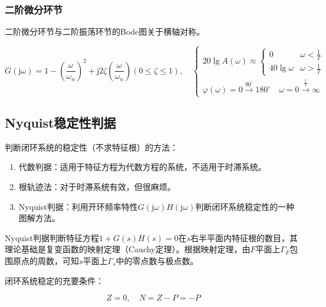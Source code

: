 \documentclass[cn, blue, normal, 12pt]{elegantnote}
\begin{document}
\subsubsection{二阶微分环节}

二阶微分环节与二阶振荡环节的Bode图关于横轴对称。

\begin{equation}
    G(\mathrm{j}\omega)=1-\left(\dfrac{\omega}{\omega_n}\right)^2+\mathrm{j}2\zeta\left(\dfrac{\omega}{\omega_n}\right) (0\leq \zeta\leq 1), \quad 
    \left\{
        \begin{array}{l}
            20\lg{A(\omega)}\approx\left\{
                \begin{array}{ll}
                    0 & \omega<\frac{1}{T} \\
                    40\lg{\omega} & \omega>\frac{1}{T}
                \end{array}
            \right. \\
            \varphi(\omega)=0 \stackrel{90^{\circ}}{\rightarrow} 180^{\circ} \quad \omega=0  \stackrel{\frac{1}{T}}{\rightarrow} \infty
        \end{array}
    \right.
\end{equation}

\subsection{Nyquist稳定性判据}

判断闭环系统的稳定性（不求特征根）的方法：

\begin{enumerate}
    \setlength{\itemsep}{6pt}
    \item 代数判据：适用于特征方程为代数方程的系统，不适用于时滞系统。
    \item 根轨迹法：对于时滞系统有效，但很麻烦。
    \item Nyquist判据：利用开环频率特性$G(\mathrm{j}\omega)H(\mathrm{j}\omega)$判断闭环系统稳定性的一种图解方法。
\end{enumerate}

Nyquist判据判断特征方程$1+G(s)H(s)=0$在$s$右半平面内特征根的数目，其理论基础是复变函数的映射定理（Cauchy定理）。根据映射定理，由$F$平面上$\varGamma_F$包围原点的周数，可知$s$平面上$\varGamma_s$中的零点数与极点数。

闭环系统稳定的充要条件：

\begin{equation}
    Z=0, \quad N=Z-P=-P
\end{equation}
\end{document}
